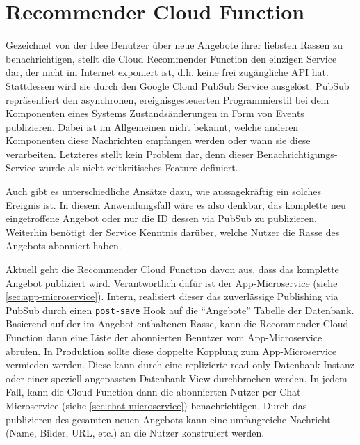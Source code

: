 \documentclass{article}
\begin{document}
\section{Recommender Cloud Function} %

Gezeichnet von der Idee Benutzer über neue Angebote ihrer liebsten Rassen zu benachrichtigen, stellt die Cloud Recommender Function den einzigen Service dar, der nicht im Internet exponiert ist, d.h. keine frei zugängliche API hat. Stattdessen wird sie durch den Google Cloud PubSub Service ausgelöst. PubSub repräsentiert den asynchronen, ereignisgesteuerten Programmierstil bei dem Komponenten eines Systems Zustandsänderungen in Form von Events publizieren. Dabei ist im Allgemeinen nicht bekannt, welche anderen Komponenten diese Nachrichten empfangen werden oder wann sie diese verarbeiten. Letzteres stellt kein Problem dar, denn dieser Benachrichtigungs-Service wurde als nicht-zeitkritisches Feature definiert.

Auch gibt es unterschiedliche Ansätze dazu, wie aussagekräftig ein solches Ereignis ist. In diesem Anwendungsfall wäre es also denkbar, das komplette neu eingetroffene Angebot oder nur die ID dessen via PubSub zu publizieren. Weiterhin benötigt der Service Kenntnis darüber, welche Nutzer die Rasse des Angebots abonniert haben. 

Aktuell geht die Recommender Cloud Function davon aus, dass das komplette Angebot publiziert wird. Verantwortlich dafür ist der App-Microservice (siehe \autoref{sec:app-microservice}). Intern, realisiert dieser das zuverlässige Publishing via PubSub durch einen \texttt{post-save} Hook auf die \enquote{Angebote} Tabelle der Datenbank. Basierend auf der im Angebot enthaltenen Rasse, kann die Recommender Cloud Function dann eine Liste der abonnierten Benutzer vom App-Microservice abrufen. In Produktion sollte diese doppelte Kopplung zum App-Microservice vermieden werden. Diese kann durch eine replizierte read-only Datenbank Instanz oder einer speziell angepassten Datenbank-View durchbrochen werden. In jedem Fall, kann die Cloud Function dann die abonnierten Nutzer per Chat-Microservice (siehe \autoref{sec:chat-microservice}) benachrichtigen. Durch das publizieren des gesamten neuen Angebots kann eine umfangreiche Nachricht (Name, Bilder, URL, etc.) an die Nutzer konstruiert werden. 
\end{document}
